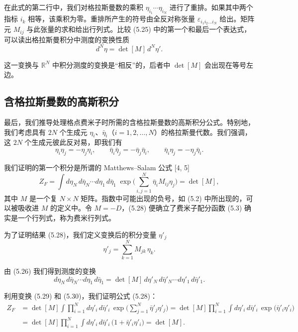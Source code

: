 在此式的第二行中，我们对格拉斯曼数的乘积 $\eta_{i_1}\cdots\eta_{i_N}$ 进行了重排。如果其中两个指标 $i_k$ 相等，该乘积为零。重排所产生的符号由全反对称张量 $\varepsilon_{i_1i_2\ldots i_N}$ 给出。矩阵元 $M_{ij}$ 与此张量的求和给出行列式。比较 (5.25) 中的第一个和最后一个表达式，可以读出格拉斯曼积分中测度的变换性质
\begin{equation}
  d^N\eta = \det[M]\,d^N\eta' .
\end{equation}

这一变换与 $\mathbb{R}^N$ 中积分测度的变换是``相反''的，后者中 $\det[M]$ 会出现在等号左边。

\subsection{含格拉斯曼数的高斯积分}

最后，我们推导处理格点费米子时所需的含格拉斯曼数的高斯积分公式。特别地，我们考虑具有 $2N$ 个生成元 $\eta_i$、$\bar{\eta}_i$（$i = 1, 2, \ldots, N$）的格拉斯曼代数。我们强调，这 $2N$ 个生成元彼此反对易，即我们有
\begin{equation}
  \eta_i\eta_j = -\eta_j\eta_i, \qquad
  \bar{\eta}_i\bar{\eta}_j = -\bar{\eta}_j\bar{\eta}_i, \qquad
  \bar{\eta}_i\eta_j = -\eta_j\bar{\eta}_i .
\end{equation}

我们证明的第一个积分是所谓的 Matthews--Salam 公式 [4, 5]
\begin{equation}
  Z_F = \int d\eta_N\,d\bar{\eta}_N\cdots d\eta_1\,d\bar{\eta}_1\;
    \exp\Big(\sum_{i,j=1}^{N}\bar{\eta}_i M_{ij}\eta_j\Big) = \det[M] ,
\end{equation}
其中 $M$ 是一个复 $N \times N$ 矩阵。指数中可能出现的负号，如 (5.2) 中所出现的，可以被吸收进 $M$ 的定义中。令 $M = -D$，(5.28) 便确立了费米子配分函数 (5.3) 确实是一个行列式，称为费米行列式。

为了证明结果 (5.28)，我们定义变换后的积分变量 $\eta'_j$
\begin{equation}
  \eta'_j = \sum_{k=1}^{N}M_{jk}\,\eta_k .
\end{equation}

由 (5.26) 我们得到测度的变换
\begin{equation}
  d\eta_N\,d\bar{\eta}_N\cdots d\eta_1\,d\bar{\eta}_1
  = \det[M]\,d\eta'_N\,d\bar{\eta}'_N\cdots d\eta'_1\,d\bar{\eta}'_1 .
\end{equation}

利用变换 (5.29) 和 (5.30)，我们证明公式 (5.28)：
\begin{equation}
  \begin{aligned}
    Z_F &= \det[M]\int\prod_{i=1}^{N}d\eta'_i\,d\bar{\eta}'_i\,
      \exp\Big(\sum_{j=1}^{N}\bar{\eta}'_j\eta'_j\Big)
      = \det[M]\prod_{i=1}^{N}\int d\eta'_i\,d\bar{\eta}'_i\,
      \exp\big(\bar{\eta}'_i\eta'_i\big)\\
      &= \det[M]\prod_{i=1}^{N}\int d\eta'_i\,d\bar{\eta}'_i\,
      \big(1 + \bar{\eta}'_i\eta'_i\big)
      = \det[M] .
  \end{aligned}
\end{equation}

